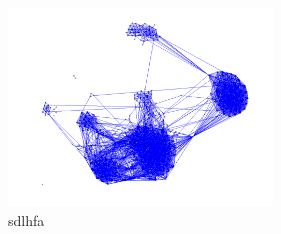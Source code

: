 \begin{figure}
\includegraphics[width=7cm]{Network-Graph}
\caption{sdlhfa}
\label{Network-Graph}
\end{figure}
